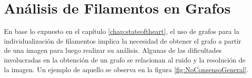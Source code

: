 \chapter{An\'alisis de Filamentos en Grafos}
\label{chap:cap2}

En base lo expuesto en el cap\'itulo \ref{chap:stateoftheart}, el uso de grafos para la individualizaci\'on de filamentos implica la necesidad de obtener el grafo a partir de una imagen para luego realizar su an\'alisis. Algunas de las dificultades involucradas en la obtenci\'on de un grafo se relacionan al ruido y la resoluci\'on de la imagen. Un ejemplo de aquello se observa en la figura \ref{fig:NoConsensoGeneral}.

